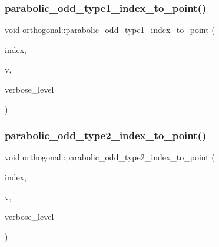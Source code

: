 \mbox{\label{classorthogonal_a90ae2eb18659cb8dcd94eafc0b4eccf7}} 
\subsubsection{\texorpdfstring{parabolic\+\_\+odd\+\_\+type1\+\_\+index\+\_\+to\+\_\+point()}{parabolic\_odd\_type1\_index\_to\_point()}}
{\footnotesize\ttfamily void orthogonal\+::parabolic\+\_\+odd\+\_\+type1\+\_\+index\+\_\+to\+\_\+point (\begin{DoxyParamCaption}\item[{\mbox{\hyperlink{galois_8h_a09fddde158a3a20bd2dcadb609de11dc}{I\+NT}}}]{index,  }\item[{\mbox{\hyperlink{galois_8h_a09fddde158a3a20bd2dcadb609de11dc}{I\+NT}} $\ast$}]{v,  }\item[{\mbox{\hyperlink{galois_8h_a09fddde158a3a20bd2dcadb609de11dc}{I\+NT}}}]{verbose\+\_\+level }\end{DoxyParamCaption})}

\mbox{\label{classorthogonal_a7bbc04bb592d92a5dc35b77f33811fe0}} 
\subsubsection{\texorpdfstring{parabolic\+\_\+odd\+\_\+type2\+\_\+index\+\_\+to\+\_\+point()}{parabolic\_odd\_type2\_index\_to\_point()}}
{\footnotesize\ttfamily void orthogonal\+::parabolic\+\_\+odd\+\_\+type2\+\_\+index\+\_\+to\+\_\+point (\begin{DoxyParamCaption}\item[{\mbox{\hyperlink{galois_8h_a09fddde158a3a20bd2dcadb609de11dc}{I\+NT}}}]{index,  }\item[{\mbox{\hyperlink{galois_8h_a09fddde158a3a20bd2dcadb609de11dc}{I\+NT}} $\ast$}]{v,  }\item[{\mbox{\hyperlink{galois_8h_a09fddde158a3a20bd2dcadb609de11dc}{I\+NT}}}]{verbose\+\_\+level }\end{DoxyParamCaption})}

